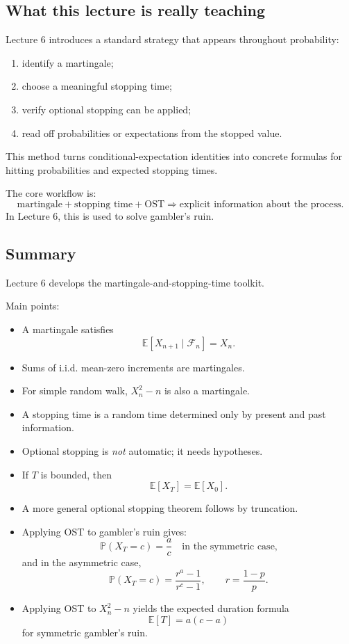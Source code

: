 \documentclass[11pt]{article}
\theoremstyle{definition}
\begin{document}
\subsection{What this lecture is really teaching}

Lecture 6 introduces a standard strategy that appears throughout probability:
\begin{enumerate}[label=\arabic*.]
    \item identify a martingale;
    \item choose a meaningful stopping time;
    \item verify optional stopping can be applied;
    \item read off probabilities or expectations from the stopped value.
\end{enumerate}

This method turns conditional-expectation identities into concrete formulas for hitting probabilities and expected stopping times.

\begin{keyformula}
The core workflow is:
\[
\text{martingale} + \text{stopping time} + \text{OST} \Longrightarrow \text{explicit information about the process}.
\]
In Lecture 6, this is used to solve gambler's ruin.
\end{keyformula}

\subsection{Summary}

\begin{summarybox}
Lecture 6 develops the martingale-and-stopping-time toolkit.

Main points:
\begin{itemize}[leftmargin=2em]
    \item A martingale satisfies
    \[
    \mathbb E[X_{n+1}\mid \mathcal F_n]=X_n.
    \]
    \item Sums of i.i.d. mean-zero increments are martingales.
    \item For simple random walk, \(X_n^2-n\) is also a martingale.
    \item A stopping time is a random time determined only by present and past information.
    \item Optional stopping is \emph{not} automatic; it needs hypotheses.
    \item If \(T\) is bounded, then
    \[
    \mathbb E[X_T]=\mathbb E[X_0].
    \]
    \item A more general optional stopping theorem follows by truncation.
    \item Applying OST to gambler's ruin gives:
    \[
    \mathbb P(X_T=c)=\frac{a}{c}
    \quad \text{in the symmetric case,}
    \]
    and in the asymmetric case,
    \[
    \mathbb P(X_T=c)=\frac{r^a-1}{r^c-1},
    \qquad r=\frac{1-p}{p}.
    \]
    \item Applying OST to \(X_n^2-n\) yields the expected duration formula
    \[
    \mathbb E[T]=a(c-a)
    \]
    for symmetric gambler's ruin.
\end{itemize}
\end{summarybox}
\end{document}
